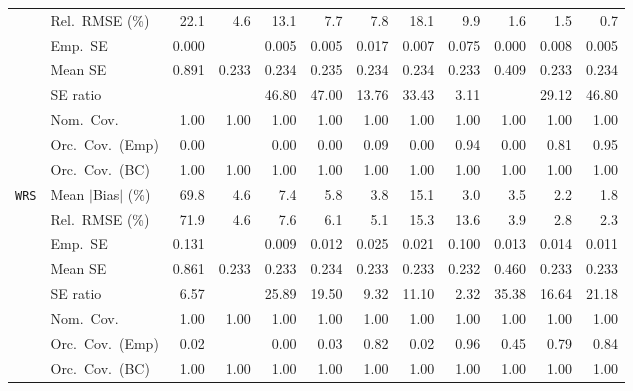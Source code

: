 \begin{landscape}
\begin{longtable}{llrrrrrrrrrr}
 & Rel.\ RMSE (\%) & 22.1 & 4.6 & 13.1 & 7.7 & 7.8 & 18.1 & 9.9 & \cellcolor{rankthree}1.6 & \cellcolor{ranktwo}1.5 & \cellcolor{rankone}0.7 \\
 & Emp.\ SE & 0.000 &  & 0.005 & 0.005 & 0.017 & 0.007 & 0.075 & 0.000 & 0.008 & 0.005 \\
 & Mean SE & 0.891 & 0.233 & 0.234 & 0.235 & 0.234 & 0.234 & 0.233 & 0.409 & 0.233 & 0.234 \\
 & SE ratio &  &  & 46.80 & 47.00 & \cellcolor{ranktwo}13.76 & 33.43 & \cellcolor{rankone}3.11 &  & \cellcolor{rankthree}29.12 & 46.80 \\
 & Nom.\ Cov. & \cellcolor{rankone}1.00 & \cellcolor{ranktwo}1.00 & \cellcolor{rankthree}1.00 & 1.00 & 1.00 & 1.00 & 1.00 & 1.00 & 1.00 & 1.00 \\
 & Orc.\ Cov.\ (Emp) & 0.00 &  & 0.00 & 0.00 & 0.09 & 0.00 & \cellcolor{ranktwo}0.94 & 0.00 & \cellcolor{rankthree}0.81 & \cellcolor{rankone}0.95 \\
 & Orc.\ Cov.\ (BC) & \cellcolor{rankone}1.00 & \cellcolor{ranktwo}1.00 & \cellcolor{rankthree}1.00 & 1.00 & 1.00 & 1.00 & 1.00 & 1.00 & 1.00 & 1.00 \\
\addlinespace[2pt]
\quad \texttt{WRS} & Mean $|$Bias$|$ (\%) & 69.8 & 4.6 & 7.4 & 5.8 & 3.8 & 15.1 & \cellcolor{rankthree}3.0 & 3.5 & \cellcolor{ranktwo}2.2 & \cellcolor{rankone}1.8 \\
 & Rel.\ RMSE (\%) & 71.9 & 4.6 & 7.6 & 6.1 & 5.1 & 15.3 & 13.6 & \cellcolor{rankthree}3.9 & \cellcolor{ranktwo}2.8 & \cellcolor{rankone}2.3 \\
 & Emp.\ SE & 0.131 &  & 0.009 & 0.012 & 0.025 & 0.021 & 0.100 & 0.013 & 0.014 & 0.011 \\
 & Mean SE & 0.861 & 0.233 & 0.233 & 0.234 & 0.233 & 0.233 & 0.232 & 0.460 & 0.233 & 0.233 \\
 & SE ratio & \cellcolor{ranktwo}6.57 &  & 25.89 & 19.50 & \cellcolor{rankthree}9.32 & 11.10 & \cellcolor{rankone}2.32 & 35.38 & 16.64 & 21.18 \\
 & Nom.\ Cov. & \cellcolor{ranktwo}1.00 & \cellcolor{rankthree}1.00 & 1.00 & 1.00 & 1.00 & 1.00 & \cellcolor{rankone}1.00 & 1.00 & 1.00 & 1.00 \\
 & Orc.\ Cov.\ (Emp) & 0.02 &  & 0.00 & 0.03 & \cellcolor{rankthree}0.82 & 0.02 & \cellcolor{rankone}0.96 & 0.45 & 0.79 & \cellcolor{ranktwo}0.84 \\
 & Orc.\ Cov.\ (BC) & \cellcolor{ranktwo}1.00 & \cellcolor{rankthree}1.00 & 1.00 & 1.00 & 1.00 & 1.00 & \cellcolor{rankone}1.00 & 1.00 & 1.00 & 1.00 \\

\end{longtable}
\end{landscape}
